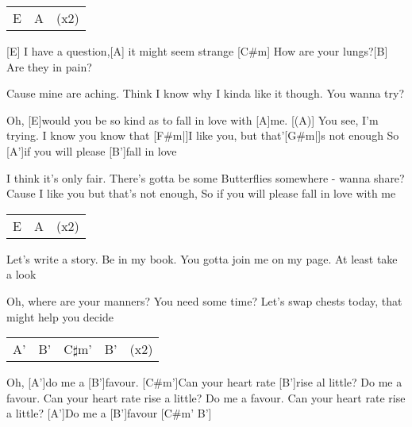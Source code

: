 
\chordscheme[%
	name = A',%
	position = 5,%
	barre = {1/1-6},%
	finger = {2/3, 3/4, 3/5}]
\chordscheme[%
	name = B',%
	position = 7,%
	barre = {1/1-6},%
	finger = {2/3, 3/4, 3/5}]
\chordscheme[%
	name = C$\sharp$m',%
	position = 9,%
	barre = {1/1-6},%
	finger = {3/4, 3/5}]


\begin{guitar}
	{\footnotesize\begin{tabular}{l|ll}
		E & A & (x2)
	\end{tabular}}
	
	[E] I have a question,[A] it might seem strange
	[C#m] How are your lungs?[B] Are they in pain?
	
	Cause mine are aching. Think I know why
	I kinda like it though. You wanna try?
	
	Oh, [E]would you be so kind as to fall in love with [A]me.
	[(A)] You see, I'm trying. I know you know that 
	[F#m|]{I }like you, but that'[G#m|]{s }not enough
	So [A']if you will please [B']fall in love
	
	I think it's only fair. There's gotta be some 
	Butterflies somewhere - wanna share?
	Cause I like you but that's not enough,
	So if you will please fall in love with me
	
	{\footnotesize\begin{tabular}{l|ll}
			E & A & (x2)
	\end{tabular}}
	
	Let's write a story. Be in my book.
	You gotta join me on my page. At least take a look
	
	Oh, where are your manners? You need some time?
	Let's swap chests today, that might help you decide
	
	 
	
	{\footnotesize\begin{tabular}{l|l|l|ll}
			A' & B' & C$\sharp$m' & B' & (x2)
	\end{tabular}}
	\pagebreak
	Oh, [A']do me a [B']favour. [C#m']Can your heart rate [B']rise al little?
	Do me a favour. Can your heart rate rise a little?
	Do me a favour. Can your heart rate rise a little?
	[A']Do me a [B']favour [C#m' B']{}
	

\end{guitar}
